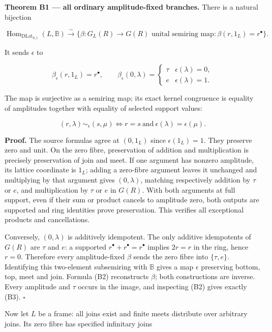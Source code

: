 \textbf{Theorem B1 --- all ordinary amplitude-fixed branches.} There is a natural bijection

\[
\operatorname{Hom}_{\mathrm{DLat}_{0,1}}(L,\mathbb B)
\xrightarrow{\sim}
\{\beta:G_L(R)\to G(R)\text{ unital semiring map}:\beta(r,1_L)=r^\bullet\}.
\tag{B1}
\]

It sends \(\epsilon\) to

\[
\beta_\epsilon(r,1_L)=r^\bullet,\qquad
\beta_\epsilon(0,\lambda)=
\begin{cases}\tau&\epsilon(\lambda)=0,\\ e&\epsilon(\lambda)=1.\end{cases}
\tag{B2}
\]

The map is surjective as a semiring map; its exact kernel congruence is equality of amplitudes together with equality of selected support values:

\[
(r,\lambda)\sim_\epsilon(s,\mu)
\iff r=s\ \text{and}\ \epsilon(\lambda)=\epsilon(\mu).
\tag{B3}
\]

\textbf{Proof.} The source formulas agree at \((0,1_L)\) since \(\epsilon (1_L)=1\). They preserve zero and unit. On the zero fibre, preservation of addition and multiplication is precisely preservation of join and meet. If one argument has nonzero amplitude, its lattice coordinate is \(1_L\); adding a zero-fibre argument leaves it unchanged and multiplying by that argument gives \((0,\lambda )\), matching respectively addition by \(\tau\) or \(e\), and multiplication by \(\tau\) or \(e\) in \(G(R)\). With both arguments at full support, even if their sum or product cancels to amplitude zero, both outputs are supported and ring identities prove preservation. This verifies all exceptional products and cancellations.

Conversely, \((0,\lambda )\) is additively idempotent. The only additive idempotents of \(G(R)\) are \(\tau\) and \(e\): a supported \(r^\bullet+r^\bullet=r^\bullet\) implies \(2r=r\) in the ring, hence \(r=0\). Therefore every amplitude-fixed \(\beta\) sends the zero fibre into \(\{\tau,e\}\). Identifying this two-element subsemiring with \(\mathbb B\) gives a map \(\epsilon\) preserving bottom, top, meet and join. Formula (B2) reconstructs \(\beta\); both constructions are inverse. Every amplitude and \(\tau\) occurs in the image, and inspecting (B2) gives exactly (B3). \(\square\)

Now let \(L\) be a frame: all joins exist and finite meets distribute over arbitrary joins. Its zero fibre has specified infinitary joins


